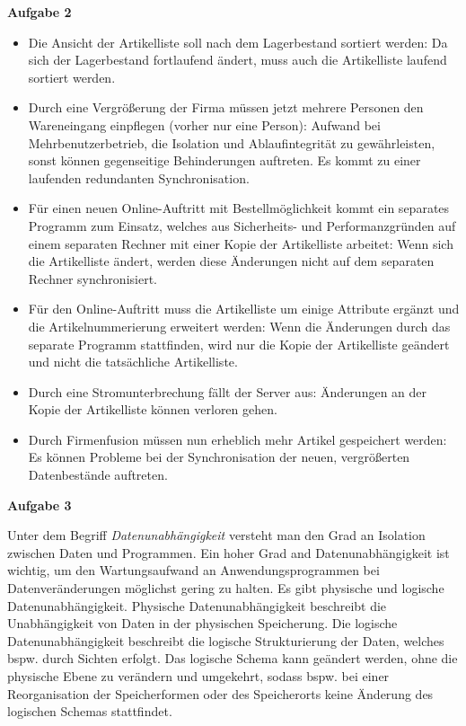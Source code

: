 \documentclass[a4paper,12pt]{article}
\newcommand{\Aufgabe}[1]{
        {
        \vspace*{0.5cm}
        \textbf{Aufgabe #1}
        \vspace*{0.2cm}
    }
}
\begin{document}
    \Aufgabe{2}
    \begin{itemize}
        \item Die Ansicht der Artikelliste soll nach dem Lagerbestand sortiert werden:
        \newline Da sich der Lagerbestand fortlaufend ändert, muss auch die Artikelliste laufend sortiert werden.
        \item Durch eine Vergrößerung der Firma müssen jetzt mehrere Personen den Wareneingang einpflegen
        (vorher nur eine Person):
        \newline Aufwand bei Mehrbenutzerbetrieb, die Isolation und Ablaufintegrität zu gewährleisten, sonst können
        gegenseitige Behinderungen auftreten. Es kommt zu einer laufenden redundanten Synchronisation.
        \item Für einen neuen Online-Auftritt mit Bestellmöglichkeit kommt ein separates Programm zum Einsatz,
        welches aus Sicherheits- und Performanzgründen auf einem separaten Rechner mit einer Kopie der Artikelliste arbeitet:
        \newline Wenn sich die Artikelliste ändert, werden diese Änderungen nicht auf dem separaten Rechner synchronisiert.
        \item Für den Online-Auftritt muss die Artikelliste um einige Attribute ergänzt und die Artikelnummerierung erweitert werden:
        \newline Wenn die Änderungen durch das separate Programm stattfinden, wird nur die Kopie der Artikelliste
        geändert und nicht die tatsächliche Artikelliste.
        \item Durch eine Stromunterbrechung fällt der Server aus:
        \newline Änderungen an der Kopie der Artikelliste können verloren gehen.
        \item Durch Firmenfusion müssen nun erheblich mehr Artikel gespeichert werden:
        \newline Es können Probleme bei der Synchronisation der neuen, vergrößerten Datenbestände auftreten.
    \end{itemize}

    \Aufgabe{3}
    \newline Unter dem Begriff \emph{Datenunabhängigkeit} versteht man den Grad an Isolation zwischen Daten und Programmen.
    Ein hoher Grad and Datenunabhängigkeit ist wichtig, um den Wartungsaufwand an Anwendungsprogrammen bei Datenveränderungen
    möglichst gering zu halten. Es gibt physische und logische Datenunabhängigkeit. Physische Datenunabhängigkeit
    beschreibt die Unabhängigkeit von Daten in der physischen Speicherung. Die logische Datenunabhängigkeit
    beschreibt die logische Strukturierung der Daten, welches bspw. durch Sichten erfolgt. Das logische Schema kann geändert
    werden, ohne die physische Ebene zu verändern und umgekehrt, sodass bspw. bei einer Reorganisation der Speicherformen
    oder des Speicherorts keine Änderung des logischen Schemas stattfindet.
\end{document}
